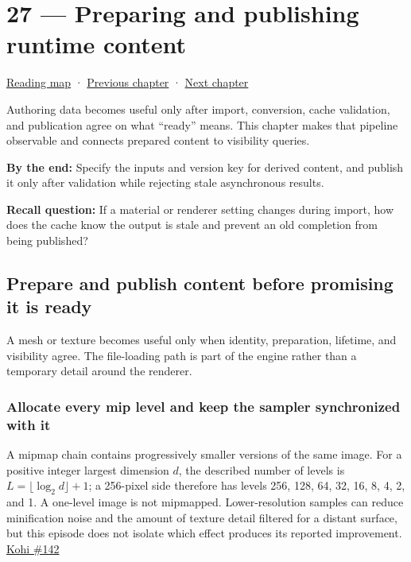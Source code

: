 \hypertarget{06-engine-ii-ch027}{}
\chapter{27 --- Preparing and publishing runtime content}\label{06-engine-ii-ch027-preparing-and-publishing-runtime-content}

\hyperref[volume-reading-map]{Reading map} · \hyperref[06-engine-ii-ch026]{Previous chapter} · \hyperref[06-engine-ii-ch028]{Next chapter}

Authoring data becomes useful only after import, conversion, cache validation, and publication agree on what ``ready'' means. This chapter makes that pipeline observable and connects prepared content to visibility queries.

\textbf{By the end:} Specify the inputs and version key for derived content, and publish it only after validation while rejecting stale asynchronous results.

\textbf{Recall question:} If a material or renderer setting changes during import, how does the cache know the output is stale and prevent an old completion from being published?

\section{Prepare and publish content before promising it is ready}\label{06-engine-ii-ch027-prepare-and-publish-content-before-promising-it-is-ready}

A mesh or texture becomes useful only when identity, preparation, lifetime, and visibility agree. The file-loading path is part of the engine rather than a temporary detail around the renderer.

\subsection{Allocate every mip level and keep the sampler synchronized with it}\label{06-engine-ii-ch027-allocate-every-mip-level-and-keep-the-sampler-synchronized-with-it}

A mipmap chain contains progressively smaller versions of the same image. For a positive integer largest dimension \(d\), the described number of levels is \(L=\lfloor\log_2 d\rfloor+1\); a 256-pixel side therefore has levels 256, 128, 64, 32, 16, 8, 4, 2, and 1. A one-level image is not mipmapped. Lower-resolution samples can reduce minification noise and the amount of texture detail filtered for a distant surface, but this episode does not isolate which effect produces its reported improvement. \href{https://www.youtube.com/watch?v=xb23Y9o7tP4}{Kohi \#142}

